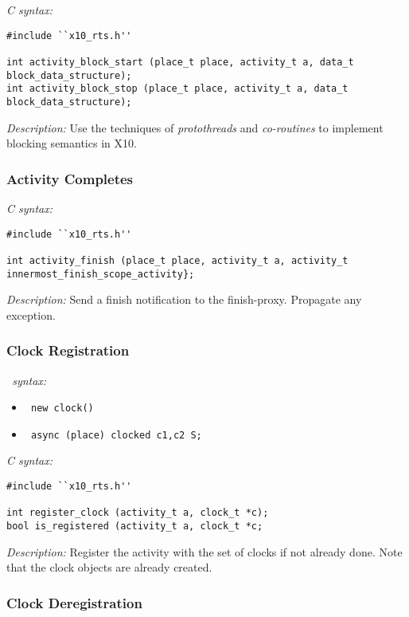 {\it C syntax:}
\begin{verbatim}
#include ``x10_rts.h''

int activity_block_start (place_t place, activity_t a, data_t block_data_structure);
int activity_block_stop (place_t place, activity_t a, data_t block_data_structure);
\end{verbatim}
{\it Description:}
Use the techniques of {\it protothreads} and {\it co-routines} to implement blocking semantics in X10.


\subsubsection{Activity Completes}

{\it C syntax:}
\begin{verbatim}
#include ``x10_rts.h''

int activity_finish (place_t place, activity_t a, activity_t innermost_finish_scope_activity};
\end{verbatim}
{\it Description:}
Send a finish notification to the finish-proxy. Propagate
any exception.



\subsubsection{Clock Registration}

{\it \Xten\ syntax:}
\\
\begin{itemize}
\item \begin{verbatim} new clock() \end{verbatim}
\item \begin{verbatim} async (place) clocked c1,c2 S; \end{verbatim}
\end{itemize}
{\it C syntax:}
\begin{verbatim}
#include ``x10_rts.h''

int register_clock (activity_t a, clock_t *c);
bool is_registered (activity_t a, clock_t *c;
\end{verbatim}

{\it Description:}
Register the activity with the set of clocks if not already done. Note that
the clock objects are already created.

\subsubsection{Clock Deregistration}

